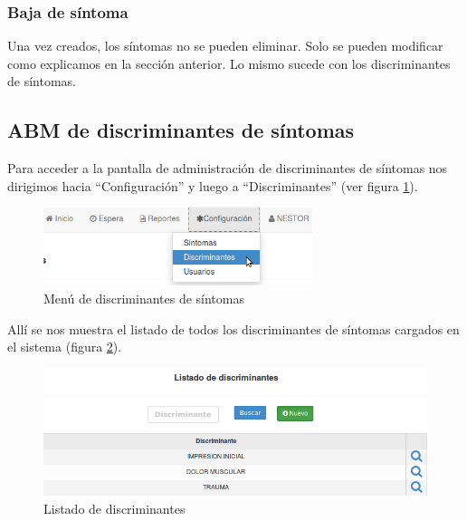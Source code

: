\subsubsection{Baja de síntoma}
Una vez creados, los síntomas no se pueden eliminar. Solo se pueden modificar como explicamos en la sección anterior. Lo mismo sucede con los discriminantes de síntomas.

\subsection{ABM de discriminantes de síntomas}\label{ABM_discriminantes}
Para acceder a la pantalla de administración de discriminantes de síntomas nos dirigimos hacia ``Configuración'' y luego a ``Discriminantes'' (ver figura \ref{fig:menu_discriminantes}).
\begin{figure}
\centerline{\includegraphics[width=0.7\textwidth]{menu_discriminantes.png}}
\caption{Menú de discriminantes de síntomas}
\label{fig:menu_discriminantes}
\end{figure}
Allí se nos muestra el listado de todos los discriminantes de síntomas cargados en el sistema (figura \ref{fig:listado_discriminantes}).
\begin{figure}
\centerline{\includegraphics[width=1\textwidth]{listado_discriminantes.png}}
\caption{Listado de discriminantes}
\label{fig:listado_discriminantes}
\end{figure}




